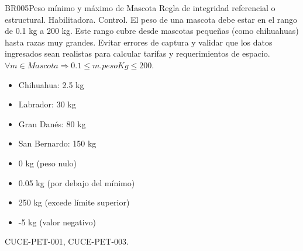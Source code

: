 \begin{BussinesRule}{BR005}{Peso mínimo y máximo de Mascota}
	\BRitem[Tipo:] Regla de integridad referencial o estructural.
	\BRitem[Clase:] Habilitadora.
	\BRitem[Nivel:] Control.
	\BRitem[Descripción:] El peso de una mascota debe estar en el rango de 0.1 kg a 200 kg. Este rango cubre desde mascotas pequeñas (como chihuahuas) hasta razas muy grandes.
	\BRitem[Motivación:] Evitar errores de captura y validar que los datos ingresados sean realistas para calcular tarifas y requerimientos de espacio.
	\BRitem[Sentencia:] $\forall m \in Mascota \Rightarrow 0.1 \leq m.pesoKg \leq 200$.
		\begin{itemize}
			\item Chihuahua: 2.5 kg
			\item Labrador: 30 kg
			\item Gran Danés: 80 kg
			\item San Bernardo: 150 kg
		\end{itemize}
		\begin{itemize}
			\item 0 kg (peso nulo)
			\item 0.05 kg (por debajo del mínimo)
			\item 250 kg (excede límite superior)
			\item -5 kg (valor negativo)
		\end{itemize}
	 CUCE-PET-001, CUCE-PET-003.
\end{BussinesRule}

